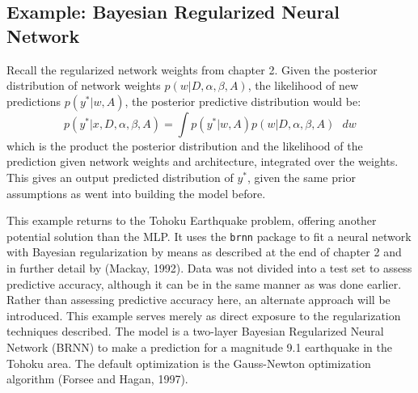 \subsection{Example: Bayesian Regularized Neural Network}

Recall the regularized network weights from chapter 2. Given the posterior distribution of network weights $p(w|D,\alpha,\beta,A)$, the likelihood of new predictions $p(y^*|w,A)$, the posterior predictive distribution would be:
$$
p(y^*|x,D,\alpha,\beta,A) = \int p(y^*|w,A) p(w|D,\alpha,\beta,A) \text{ } dw
$$
which is the product the posterior distribution and the likelihood of the prediction given network weights and architecture, integrated over the weights.  This gives an output predicted distribution of $y^*$, given the same prior assumptions as went into building the model before.

This example returns to the Tohoku Earthquake problem, offering another potential solution than the MLP.  It uses the \texttt{brnn} package \cite{brnn} to fit a neural network with Bayesian regularization by means as described at the end of chapter 2 and in further detail by (Mackay, 1992).  Data was not divided into a test set to assess predictive accuracy, although it can be in the same manner as was done earlier.  Rather than assessing predictive accuracy here, an alternate approach will be introduced.  This example serves merely as direct exposure to the regularization techniques described.
The model is a two-layer Bayesian Regularized Neural Network (BRNN) to make a prediction for a magnitude 9.1 earthquake in the Tohoku area. %
The default optimization is the Gauss-Newton optimization algorithm (Forsee and Hagan, 1997).

